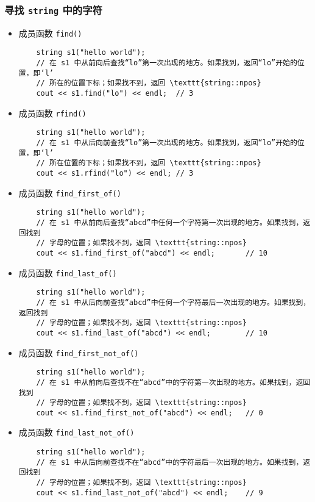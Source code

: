 \documentclass[UTF8]{ctexart}
\begin{document}
\subsubsection{寻找 \texttt{string} 中的字符}
\begin{itemize}
    \item 成员函数 \texttt{find()}
    \begin{verbatim}
    string s1("hello world");
    // 在 s1 中从前向后查找“lo”第一次出现的地方。如果找到，返回“lo”开始的位置，即‘l’
    // 所在的位置下标；如果找不到，返回 \texttt{string::npos}
    cout << s1.find("lo") << endl;  // 3
    \end{verbatim}
    \item 成员函数 \texttt{rfind()}
    \begin{verbatim}
    string s1("hello world");
    // 在 s1 中从后向前查找“lo”第一次出现的地方。如果找到，返回“lo”开始的位置，即‘l’
    // 所在位置的下标；如果找不到，返回 \texttt{string::npos}
    cout << s1.rfind("lo") << endl; // 3
    \end{verbatim}
    \item 成员函数 \texttt{find\_first\_of()}
    \begin{verbatim}
    string s1("hello world");
    // 在 s1 中从前向后查找“abcd”中任何一个字符第一次出现的地方。如果找到，返回找到
    // 字母的位置；如果找不到，返回 \texttt{string::npos}
    cout << s1.find_first_of("abcd") << endl;       // 10
    \end{verbatim}
    \item 成员函数 \texttt{find\_last\_of()}
    \begin{verbatim}
    string s1("hello world");
    // 在 s1 中从后向前查找“abcd”中任何一个字符最后一次出现的地方。如果找到，返回找到
    // 字母的位置；如果找不到，返回 \texttt{string::npos}
    cout << s1.find_last_of("abcd") << endl;        // 10
    \end{verbatim}
    \item 成员函数 \texttt{find\_first\_not\_of()}
    \begin{verbatim}
    string s1("hello world");
    // 在 s1 中从前向后查找不在“abcd”中的字符第一次出现的地方。如果找到，返回找到
    // 字母的位置；如果找不到，返回 \texttt{string::npos}
    cout << s1.find_first_not_of("abcd") << endl;   // 0
    \end{verbatim}
    \item 成员函数 \texttt{find\_last\_not\_of()}
    \begin{verbatim}
    string s1("hello world");
    // 在 s1 中从后向前查找不在“abcd”中的字符最后一次出现的地方。如果找到，返回找到
    // 字母的位置；如果找不到，返回 \texttt{string::npos}
    cout << s1.find_last_not_of("abcd") << endl;    // 9
    \end{verbatim}
\end{itemize}
\end{document}
